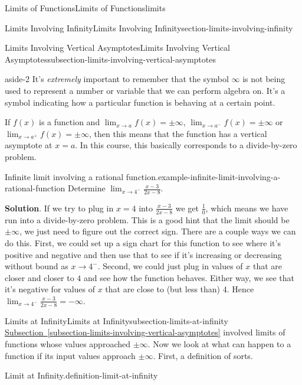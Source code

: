 \documentclass[oneside,10pt,]{book}
\numberwithin{equation}{section}
\begin{document}
\begin{chapterptx}{Limits of Functions}{}{Limits of Functions}{}{}{limits}
\begin{sectionptx}{Limits Involving Infinity}{}{Limits Involving Infinity}{}{}{section-limits-involving-infinity}
\begin{subsectionptx}{Limits Involving Vertical Asymptotes}{}{Limits Involving Vertical Asymptotes}{}{}{subsection-limits-involving-vertical-asymptotes}
\begin{aside}{}{aside-2}%
\hypertarget{p-55}{}%
It's \emph{extremely} important to remember that the symbol \(\infty\) is not being used to represent a number or variable that we can perform algebra on. It's a symbol indicating how a particular function is behaving at a certain point.%
\end{aside}
\hypertarget{p-56}{}%
If \(f(x)\) is a function and \(\lim_{x\to a}f(x)=\pm\infty\), \(\lim_{x\to a^{-}}f(x)=\pm\infty\) or \(\lim_{x\to a^{+}}f(x)=\pm\infty\), then this means that the function has a vertical asymptote at \(x=a\). In this course, this basically corresponds to a divide-by-zero problem.%
\begin{example}{Infinite limit involving a rational function.}{example-infinite-limit-involving-a-rational-function}%
\hypertarget{p-57}{}%
Determine \(\lim_{x\to4^{-}}\frac{x-3}{2x-8}\).%
\par\smallskip%
\noindent\textbf{Solution}.\hypertarget{solution-11}{}\quad%
\hypertarget{p-58}{}%
If we try to plug in \(x=4\) into \(\frac{x-3}{2x-8}\) we get \(\frac{1}{0}\), which means we have run into a divide-by-zero problem. This is a good hint that the limit should be \(\pm\infty\), we just need to figure out the correct sign. There are a couple ways we can do this. First, we could set up a sign chart for this function to see where it's positive and negative and then use that to see if it's increasing or decreasing without bound as \(x\to4^{-}\). Second, we could just plug in values of \(x\) that are closer and closer to \(4\) and see how the function behaves. Either way, we see that it's negative for values of \(x\) that are close to (but less than) \(4\). Hence \(\lim_{x\to4^{-}}\frac{x-3}{2x-8}=-\infty\).%
\end{example}
\end{subsectionptx}
%
%
\typeout{************************************************}
\typeout{************************************************}
%
\begin{subsectionptx}{Limits at Infinity}{}{Limits at Infinity}{}{}{subsection-limits-at-infinity}
\hypertarget{p-59}{}%
\hyperref[subsection-limits-involving-vertical-asymptotes]{Subsection~\ref{subsection-limits-involving-vertical-asymptotes}} involved limits of functions whose values approached \(\pm\infty\). Now we look at what can happen to a function if its input values approach \(\pm\infty\). First, a definition of sorts.%
\begin{definition}{Limit at Infinity.}{definition-limit-at-infinity}%

\end{definition}
\end{subsectionptx}
\end{sectionptx}
\end{chapterptx}
\end{document}
